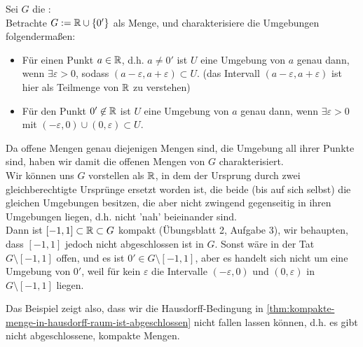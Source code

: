 \begin{example}
    Sei $G$ die : \\
    Betrachte $G:=\mathbb{R} \cup  \left \{0'\right\} $ als Menge, und charakterisiere die Umgebungen folgendermaßen:
    \begin{itemize}
        \item Für einen Punkt $a\in \mathbb{R}$, d.h. $a\neq 0'$ ist $U$ eine Umgebung von  $a$ genau dann, wenn  $\exists ε>0$, sodass $(a-ε,a+ε)\subset U$. (das Intervall $(a-ε,a+ε)$ ist hier als Teilmenge von  $\mathbb{R}$ zu verstehen)
        \item Für den Punkt $0'\not\in \mathbb{R}$ ist $U$ eine Umgebung von $a$ genau dann, wenn  $\exists ε>0$ mit $(-ε,0) \cup (0,ε)\subset U$.
    \end{itemize}
    Da offene Mengen genau diejenigen Mengen sind, die Umgebung all ihrer Punkte sind, haben wir damit die offenen Mengen von $G$ charakterisiert. \\
    Wir können uns $G$ vorstellen als  $\mathbb{R}$, in dem der Ursprung durch zwei gleichberechtigte Ursprünge ersetzt worden ist, die beide (bis auf sich selbst) die gleichen Umgebungen besitzen, die aber nicht zwingend gegenseitig in ihren Umgebungen liegen, d.h. nicht 'nah' beieinander sind. \\
    Dann ist $[-1,1]\subset \mathbb{R}\subset G$ kompakt (Übungsblatt 2, Aufgabe 3), wir behaupten, dass $[-1,1]$ jedoch nicht abgeschlossen ist in  $G$. Sonst wäre in der Tat  $G \setminus [-1,1]$ offen, und es ist $0' \in G\setminus [-1,1]$, aber es handelt sich nicht um eine Umgebung von $0'$, weil für kein  $ε$ die Intervalle  $(-ε,0)$ und  $(0,ε)$ in  $G\setminus [-1,1]$ liegen. \\
\end{example}
\begin{remark*}
    Das Beispiel zeigt also, dass wir die Hausdorff-Bedingung in \autoref{thm:kompakte-menge-in-hausdorff-raum-ist-abgeschlossen} nicht fallen lassen können, d.h. es gibt nicht abgeschlossene, kompakte Mengen.
\end{remark*}

